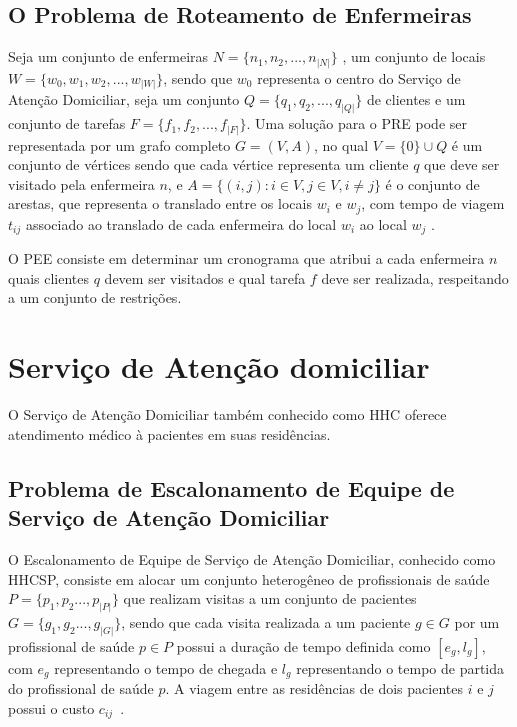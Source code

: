 \subsection{O Problema de Roteamento de Enfermeiras}

Seja um conjunto de enfermeiras $N = \{n_1, n_2, ..., n_{|N|}\}$ , um conjunto de locais $W = \{w_0, w_1, w_2, ..., w_{|W|}\}$, sendo que $w_0$ representa o centro do Serviço de Atenção Domiciliar, seja um conjunto $Q = \{q_1, q_2, ..., q_{|Q|}\}$ de clientes e um conjunto de tarefas $F = \{ f_1, f_2, ..., f_{|F|}\}$.  
Uma solução para o \ac{PRE} pode ser representada por um grafo completo $G = (V, A)$, no qual $V = \{0\} \cup Q$ é um conjunto de vértices sendo que cada vértice representa um cliente $q$ que deve ser visitado pela enfermeira $n$, e $A = \{ (i,j): i \in V, j \in V, i \neq j \}$ é o conjunto de arestas, que representa o translado entre os locais $w_i$ e $w_j$, com tempo de viagem $t_{ij}$ associado ao translado de cada enfermeira do local $w_i$ ao local $w_j$ \cite{mansini:2016}.

O \ac{PEE} consiste em determinar um cronograma que atribui a cada enfermeira $n$ quais clientes $q$ devem ser visitados e qual tarefa $f$ deve ser realizada, respeitando a um conjunto de restrições\cite{mansini:2016}.

\section{Serviço de Atenção domiciliar}

O Serviço de Atenção Domiciliar também conhecido como \ac{HHC} oferece atendimento médico à pacientes em suas residências. 

\subsection{Problema de Escalonamento de Equipe de Serviço de Atenção Domiciliar}

O Escalonamento de Equipe de Serviço de Atenção Domiciliar, conhecido como \ac{HHCSP}, consiste em alocar um conjunto heterogêneo de profissionais de saúde $P = \{ p_1, p_2 ..., p_{|P|} \}$  que realizam visitas a um conjunto de pacientes  $G = \{ g_1, g_2 ..., g_{|G|} \}$, sendo que cada visita realizada a um paciente $g \in G$ por um profissional de saúde $p \in P$ possui a duração de tempo definida como $[e_{g}, l_{g}]$, com $e_{g}$ representando o tempo de chegada e $l_{g}$ representando o tempo de partida do profissional de saúde $p$. A viagem entre as residências de dois pacientes $i$ e $j$  possui o custo $c_{ij}$~\cite{rasmussenm:2012}.   

